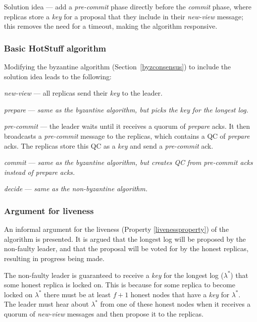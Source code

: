 Solution idea --- add a \textit{pre-commit} phase directly before the \textit{commit} phase, where replicas store a \textit{key} for a proposal that they include in their \textit{new-view} message; this removes the need for a timeout, making the algorithm responsive.

\subsubsection{Basic HotStuff algorithm}

Modifying the byzantine algorithm (Section~\ref{byzconsensus}) to include the solution idea leads to the following:

\begin{description}
	\item \textit{new-view} --- all replicas send their \textit{key} to the leader.
	\item \textit{prepare} ---  \textit{same as the byzantine algorithm, but picks the key for the longest log.}
	\item \textit{pre-commit} --- the leader waits until it receives a quorum of \textit{prepare} acks. It then broadcasts a \textit{pre-commit} message to the replicas, which contains a QC of \textit{prepare} acks. The replicas store this QC as a \textit{key} and send a \textit{pre-commit} ack.
	\item \textit{commit} --- \textit{same as the byzantine algorithm, but creates QC from pre-commit acks instead of prepare acks.}
	\item \textit{decide} --- \textit{same as the non-byzantine algorithm.}
\end{description}

\subsubsection{Argument for liveness} \label{livenessargument}
An informal argument for the liveness (Property \ref{livenessproperty}) of the algorithm is presented. It is argued that the longest log will be proposed by the non-faulty leader, and that the proposal will be voted for by the honest replicas, resulting in progress being made.

The non-faulty leader is guaranteed to receive a \textit{key} for the longest log ($\lambda^*$) that some honest replica is locked on. This is because for some replica to become locked on $\lambda^*$ there must be at least $f + 1$ honest nodes that have a \textit{key} for $\lambda^*$. The leader must hear about $\lambda^*$ from one of these honest nodes when it receives a quorum of \textit{new-view} messages and then propose it to the replicas.


